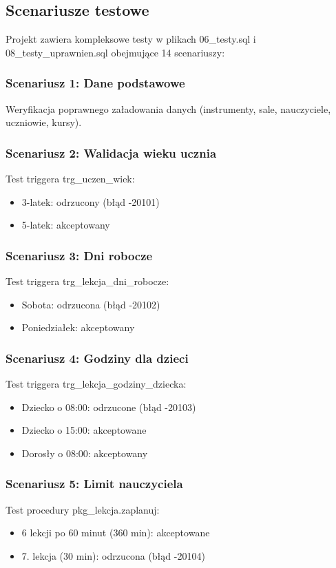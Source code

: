 \documentclass[12pt,a4paper]{article}
\begin{document}
\subsection{Scenariusze testowe}

Projekt zawiera kompleksowe testy w plikach 06\_testy.sql i 08\_testy\_uprawnien.sql obejmujące 14 scenariuszy:

\subsubsection{Scenariusz 1: Dane podstawowe}
Weryfikacja poprawnego załadowania danych (instrumenty, sale, nauczyciele, uczniowie, kursy).

\subsubsection{Scenariusz 2: Walidacja wieku ucznia}
Test triggera trg\_uczen\_wiek:
\begin{itemize}[nosep]
    \item 3-latek: odrzucony (błąd -20101)
    \item 5-latek: akceptowany
\end{itemize}

\subsubsection{Scenariusz 3: Dni robocze}
Test triggera trg\_lekcja\_dni\_robocze:
\begin{itemize}[nosep]
    \item Sobota: odrzucona (błąd -20102)
    \item Poniedziałek: akceptowany
\end{itemize}

\subsubsection{Scenariusz 4: Godziny dla dzieci}
Test triggera trg\_lekcja\_godziny\_dziecka:
\begin{itemize}[nosep]
    \item Dziecko o 08:00: odrzucone (błąd -20103)
    \item Dziecko o 15:00: akceptowane
    \item Dorosły o 08:00: akceptowany
\end{itemize}

\subsubsection{Scenariusz 5: Limit nauczyciela}
Test procedury pkg\_lekcja.zaplanuj:
\begin{itemize}[nosep]
    \item 6 lekcji po 60 minut (360 min): akceptowane
    \item 7. lekcja (30 min): odrzucona (błąd -20104)
\end{itemize}
\end{document}
